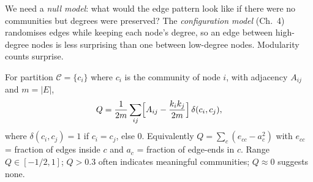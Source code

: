 We need a \emph{null model}: what would the edge pattern look like if there were no communities but degrees were preserved? The \emph{configuration model} (Ch.~4) randomises edges while keeping each node's degree, so an edge between high-degree nodes is less surprising than one between low-degree nodes. Modularity counts surprise.

\begin{definition}[Modularity $Q$]\label{def:modularity}
For partition $\mathcal{C}=\{c_i\}$ where $c_i$ is the community of node $i$, with adjacency $A_{ij}$ and $m=|E|$,
\begin{equation}
Q=\frac1{2m}\sum_{ij}\Bigl[A_{ij}-\frac{k_i k_j}{2m}\Bigr]\,\delta(c_i,c_j),
\end{equation}
where $\delta(c_i,c_j)=1$ if $c_i=c_j$, else $0$. Equivalently $Q=\sum_{c}(e_{cc}-a_c^2)$ with $e_{cc}$ = fraction of edges inside $c$ and $a_c$ = fraction of edge-ends in $c$. Range $Q\in[-1/2,1]$; $Q>0.3$ often indicates meaningful communities; $Q\approx0$ suggests none.
\end{definition}

